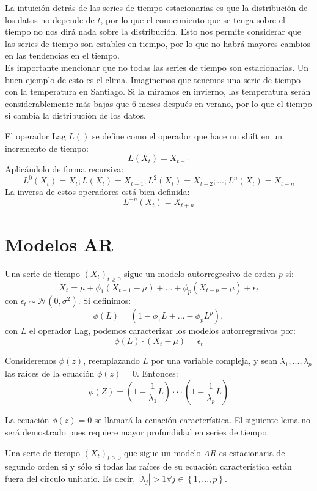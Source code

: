  La intuición detrás de las series de tiempo estacionarias es que la distribución de los datos no depende de $t$, por lo que el conocimiento que se tenga sobre el tiempo no nos dirá nada sobre la distribución. 
 Esto nos permite considerar que las series de tiempo son estables en tiempo, por lo que no habrá mayores cambios en las tendencias en el tiempo. \\
 Es importante mencionar que no todas las series de tiempo son estacionarias. Un buen ejemplo de esto es el clima. Imaginemos que tenemos una serie de tiempo con la temperatura en Santiago. Si la miramos en invierno, las temperatura serán considerablemente más bajas que 6 meses después en verano, por lo que el tiempo si cambia la distribución de los datos. 
 
 \begin{definition}  El operador Lag $L()$ se define como el operador que hace un shift en un incremento de tiempo:
 $$
 L(X_t)=X_{t-1}
 $$
 Aplicándolo de forma recursiva: 
 $$ 
 L^{0}(X_t)=X_t; L(X_t)=X_{t-1}; L^{2}(X_t)=X_{t-2};...; L^{n}(X_t)=X_{t-n}
 $$
 La inversa de estos operadores está bien definida: 
 $$
 L^{-n}(X_t)=X_{t+n}
 $$
 \end{definition}
 
\section{Modelos AR}
 
\begin{definition}
Una serie de tiempo $(X_t)_{t \geq 0}$ sigue un modelo autorregresivo de orden $p$ si: 
$$
X_t=\mu + \phi_1 (X_{t-1}-\mu)+...+\phi_p (X_{t-p}-\mu) + \epsilon_t
$$
con $ \epsilon_t \sim \mathcal{N}(0,\sigma^2)$. Si definimos: 
$$
\phi(L)=(1-\phi_1 L +...-\phi _p L^{p}),
$$
con $L$ el operador Lag, podemos caracterizar los modelos autorregresivos por: 
$$
\phi(L)\cdot (X_t - \mu)=\epsilon_t
$$
\end{definition}

Consideremos $\phi(z)$, reemplazando $L$ por una variable compleja, y sean $\lambda_1,...,\lambda_p$ las raíces de la ecuación $\phi(z)=0$. Entonces: 
$$
\phi(Z)=(1-\dfrac{1}{\lambda_1}L) 
\cdot \cdot \cdot(1-\dfrac{1}{\lambda_p}L)  $$

La ecuación $\phi(z)=0$ se llamará la ecuación característica. El siguiente lema no será demostrado pues requiere mayor profundidad en series de tiempo. 

\begin{lemma}
Una serie de tiempo $(X_t)_{t \geq 0}$ que sigue un modelo $AR$ es estacionaria de segundo orden si y sólo si todas las raíces de su ecuación característica están fuera del círculo unitario. Es decir, $|\lambda_j| > 1 \forall j \in \left \{ 1,...,p \right \}$.
\end{lemma}

